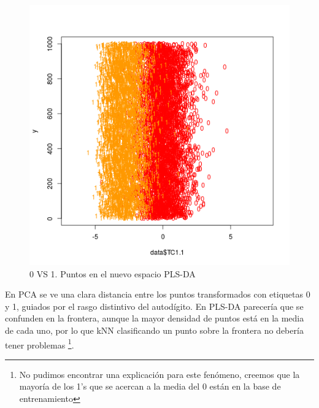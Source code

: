 \begin{figure}[h!]
  \begin{center}
	\includegraphics[scale=0.8]{exp5/PLS-1-0vs1}
	\caption{0 VS 1. Puntos en el nuevo espacio PLS-DA}
  \end{center}
\end{figure}

En PCA se ve una clara distancia entre los puntos transformados con etiquetas 0 y 1, guiados por el rasgo distintivo del autod\'igito. En PLS-DA parecer\'ia que se confunden en la frontera, aunque la mayor densidad de puntos est\'a en la media de cada uno, por lo que kNN clasificando un punto sobre la frontera no deber\'ia tener problemas \footnote{No pudimos encontrar una explicaci\'on para este fen\'omeno, creemos que la mayor\'ia de los 1's que se acercan a la media del 0 est\'an en la base de entrenamiento}.
